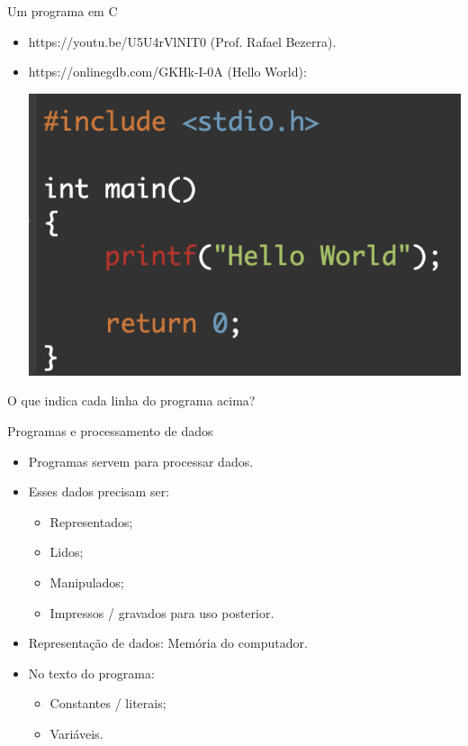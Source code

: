\documentclass[handout,t]{beamer}
\begin{document}
\begin{frame}{Um programa em C}
\begin{itemize}
    \item https://youtu.be/U5U4rVlNIT0 (Prof. Rafael Bezerra).
    \item https://onlinegdb.com/GKHk-I-0A (Hello World):
\begin{center}
    \includegraphics[scale=0.8]{figuras/helloworld.png}
\end{center}
\end{itemize}

O que indica cada linha do programa acima?
\end{frame}

\begin{frame}{Programas e processamento de dados}

\begin{itemize}
    \item Programas servem para processar dados.
    \item Esses dados precisam ser:
    \begin{itemize}
        \item Representados;
        \item Lidos;
        \item Manipulados;
        \item Impressos / gravados para uso posterior.
    \end{itemize}
    \item Representação de dados: Memória do computador.
    \item No texto do programa:
    \begin{itemize}
        \item Constantes / literais;
        \item Variáveis.
    \end{itemize}
\end{itemize}    
\end{frame}
\end{document}
